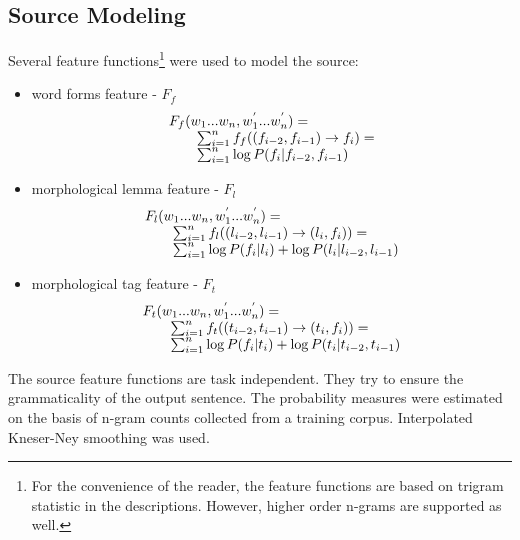 \documentclass[11pt]{article}
\begin{document}
\subsection{Source Modeling}
\label{sec:source-mod}
Several feature functions\footnote{For the convenience of the reader, the feature functions are based on trigram statistic in the descriptions. However, higher order n-grams are supported as well.}  were used to model the source:
%
\begin{itemize}
\item word forms feature - $F_f$
\[
    \begin{array}{rcl}
        \multicolumn{3}{l}{F_f(w_1 ... w_n, w_1^{'} ... w_n^{'}) = }\\
            &	&	\sum_{i = 1}^n f_f( (f_{i-2}, f_{i-1}) \to f_i ) = \\
            &	&	\sum_{i = 1}^n \log P(f_i | f_{i - 2}, f_{i - 1})
    \end{array}
\]
%
\end{itemize}
\begin{itemize}
\item morphological lemma feature - $F_l$
\[
    \begin{array}{rcl}
       \multicolumn{3}{l}{F_l(w_1 ... w_n, w_1^{'} ... w_n^{'}) = }\\
       &	&	\sum_{i = 1}^n f_l( (l_{i-2}, l_{i-1}) \to (l_i, f_i) ) = \\
       &	&	\sum_{i = 1}^n \log P(f_i | l_i) + \log P(l_i | l_{i-2}, l_{i-1})
    \end{array}
\]
%
\item morphological tag feature - $F_t$
\[
    \begin{array}{rcl}
        \multicolumn{3}{l}{F_t(w_1 ... w_n, w_1^{'} ... w_n^{'}) = }\\
        &	& \sum_{i = 1}^n f_t( (t_{i-2}, t_{i-1}) \to (t_i, f_i) ) = \\
        &	& \sum_{i = 1}^n \log P(f_i | t_i) + \log P(t_i | t_{i-2}, t_{i-1})
    \end{array}
\]
\end{itemize}

The source feature functions are task independent. They try to ensure the
grammaticality of the output sentence. The probability measures were estimated
on the basis of n-gram counts collected from a training corpus. Interpolated
Kneser-Ney \cite{kneser_ney:1995} smoothing was used.
\end{document}
